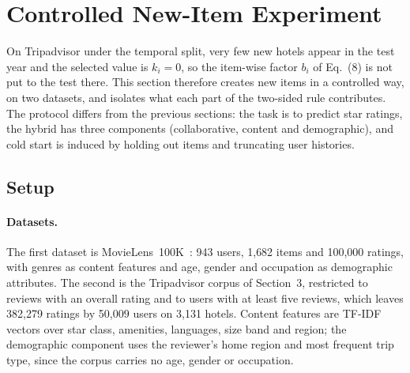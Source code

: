 %
\section{Controlled New-Item Experiment}
\label{sec:newitem}

On Tripadvisor under the temporal split, very few new hotels appear in the test year and the selected value is $k_i = 0$, so the item-wise factor $b_i$ of Eq.~(8) is not put to the test there. This section therefore creates new items in a controlled way, on two datasets, and isolates what each part of the two-sided rule contributes. The protocol differs from the previous sections: the task is to predict star ratings, the hybrid has three components (collaborative, content and demographic), and cold start is induced by holding out items and truncating user histories.

\subsection{Setup}

\paragraph{Datasets.} The first dataset is MovieLens~100K~\cite{harper2015}: 943 users, 1{,}682 items and 100{,}000 ratings, with genres as content features and age, gender and occupation as demographic attributes. The second is the Tripadvisor corpus of Section~3, restricted to reviews with an overall rating and to users with at least five reviews, which leaves 382{,}279 ratings by 50{,}009 users on 3{,}131 hotels. Content features are TF-IDF vectors over star class, amenities, languages, size band and region; the demographic component uses the reviewer's home region and most frequent trip type, since the corpus carries no age, gender or occupation.


